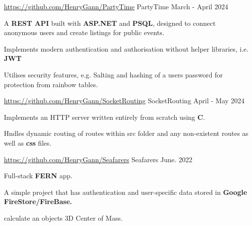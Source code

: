 
\begin{cventries}
  \cventry
    {\href{https://github.com/HenryGann/PartyTime}{\faLink \space https://github.com/HenryGann/PartyTime}}
    {PartyTime}
    {}
    {March - April 2024} %
    {
      \begin{cvitems}
        \item {A \textbf{REST API} built with \textbf{ASP.NET} and \textbf{PSQL}, designed to connect anonymous users and create listings for public events.}
        \item {Implements modern authentication and authorisation without helper libraries, i.e. \textbf{JWT}}
        \item {Utilises security features, e.g. Salting and hashing of a users password for protection from rainbow tables.}
      \end{cvitems}
    }

  \cventry
    {\href{https://github.com/HenryGann/SocketRouting}{\faLink \space https://github.com/HenryGann/SocketRouting}} %
    {SocketRouting} %
    {} %
    {April - May 2024} %
    {
      \begin{cvitems} %
        \item {Implements an HTTP server written entirely from scratch using \textbf{C}. }
        \item {Hndles dynamic routing of routes within src folder and any non-existent routes as well as \textbf{css} files. }
      \end{cvitems}
    }

  \cventry
  {\href{https://github.com/HenryGann/Seafarers}{\faLink \space https://github.com/HenryGann/Seafarers}} %
  {Seafarers} %
  {} %
  {June. 2022} %
  {
    \begin{cvitems} %
      \item {Full-stack \textbf{FERN} app.}
      \item {A simple project that has authentication and user-specific data stored in \textbf{Google FireStore/FireBase.}}
      \item {calculate an objects 3D Center of Mass.}
    \end{cvitems}
  }

\end{cventries}
